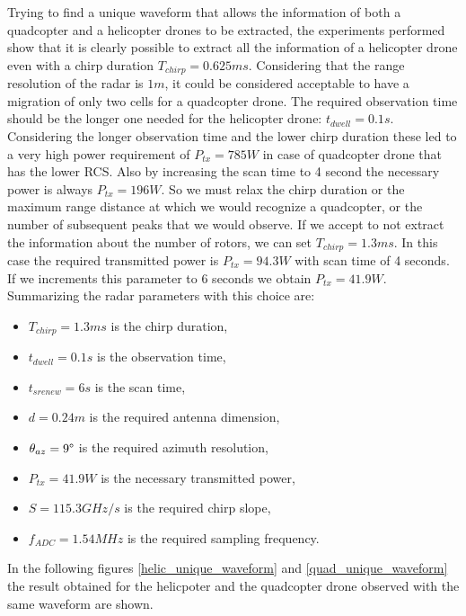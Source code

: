 Trying to find a unique waveform that allows the information of both a quadcopter and a helicopter drones to be extracted, the experiments performed show that it is clearly possible to extract all the information of a helicopter drone even with a chirp duration $T_{chirp} = 0.625 ms$. Considering that the range resolution of the radar is $1 m$, it could be considered acceptable to have a migration of only two cells for a quadcopter drone. The required observation time should be the longer one needed for the helicopter drone: $t_{dwell} = 0.1s$.
Considering the longer observation time and the lower chirp duration these led to a very high power requirement of $P_{tx} = 785 W$ in case of quadcopter drone that has the lower RCS. Also by increasing the scan time to 4 second the necessary power is always $P_{tx} = 196 W$. So we must relax the chirp duration or the maximum range distance at which we would recognize a quadcopter, or the number of subsequent peaks that we would observe. If we accept to not extract the information about the number of rotors, we can set $T_{chirp} = 1.3ms$. In this case the required transmitted power is $P_{tx} = 94.3 W$ with scan time of 4 seconds. If we increments this parameter to 6 seconds we obtain $P_{tx} = 41.9 W$.
Summarizing the radar parameters with this choice are:
\begin{itemize}

    \item $T_{chirp} = 1.3ms$ is the chirp duration,
    
    \item $t_{dwell} = 0.1s$ is the observation time,
    
    \item $t_{srenew} = 6 s$ is the scan time,

    \item $d = 0.24 m$ is the required antenna dimension,
         
    \item $\theta_{az} = 9\degree$ is the required azimuth resolution,

    \item $P_{tx} = 41.9 W$ is the necessary transmitted power,
    
    \item $S = 115.3 GHz/s$ is the required chirp slope,
    
    \item $f_{ADC} = 1.54 MHz$ is the required sampling frequency.
    
\end{itemize}
In the following figures \ref{helic_unique_waveform} and \ref{quad_unique_waveform} the result obtained for the helicpoter and the quadcopter drone observed with the same waveform are shown.

